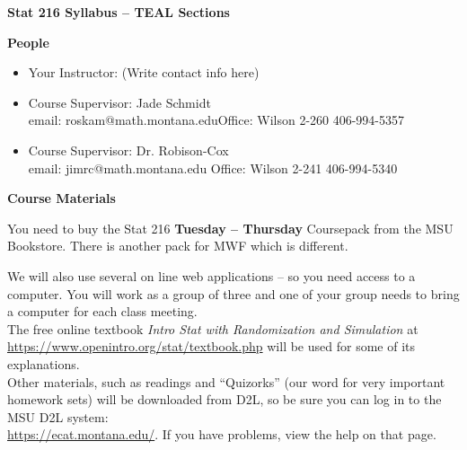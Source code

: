 \setcounter{page}{1}

\def\theTopic{Intro \& Syllabus }
\def\dayNum{1}


\begin{center}
\vspace*{.1in}
{\bf {\large Stat 216 Syllabus -- TEAL Sections}}\\
\end{center}
\vspace{-.1in}

\begin{center}
  {\bf People}
\end{center}
\begin{itemize}
\item Your Instructor: (Write contact info here) \vspace{5.5cm}
\item Course Supervisor:  Jade Schmidt\\
     email: roskam@math.montana.edu\hfill Office: Wilson 2-260 \hfill
     406-994-5357
   \item Course Supervisor: Dr. Robison-Cox\\
     email: jimrc@math.montana.edu \hfill  Office: Wilson 2-241 \hfill
     406-994-5340
\end{itemize}


\begin{center}
  {\bf Course Materials}
\end{center}
  You need to buy the Stat 216 {\bf Tuesday -- Thursday} Coursepack from the MSU
  Bookstore.  There is another pack for MWF which is different.

  We will also use several on line web applications -- so you need
  access to a computer.  You will work as a group of three and one of
  your group needs to bring a computer for each class meeting.\\
  The free online textbook {\it Intro Stat with Randomization and
    Simulation} at \url{https://www.openintro.org/stat/textbook.php}
  will be used for some of its explanations.\\
  Other materials, such as readings and ``Quizorks'' (our word for
  very important homework sets) will be downloaded from D2L, so be
  sure you can log in to the MSU D2L system:\\
   \url{https://ecat.montana.edu/}.  If you have problems, view the
   help on that page.
\newpage


